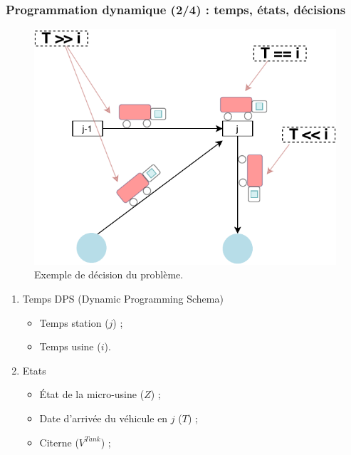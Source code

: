 \documentclass[hyperref={bookmarks=false},aspectratio=169]{beamer}
\begin{document}
\begin{frame}
	\frametitle{Programmation dynamique (2/4) : temps, états, décisions}
 


\begin{minipage}{.4\textwidth}%

\begin{figure}
    \centering
   \includegraphics[width=\textwidth]{./figures/positions_vehicule.pdf}%
   \caption{Exemple de décision du problème.}
   \label{fig:my_label}
\end{figure}

\end{minipage}%
\hfill
\begin{minipage}{.6\textwidth}%
\begin{enumerate}
\item Temps DPS (Dynamic Programming Schema)
\begin{itemize}
\item Temps station ($j$) ;
\item Temps usine ($i$).

\end{itemize}
\item Etats %
\begin{itemize}
\item \'{E}tat de la micro-usine ($Z$) ;
\item Date d'arrivée du véhicule en $j$ ($T$) ;
\item Citerne ($V^{Tank}$) ;


\end{itemize}
\end{enumerate}
\end{minipage}
\end{frame}
\end{document}
